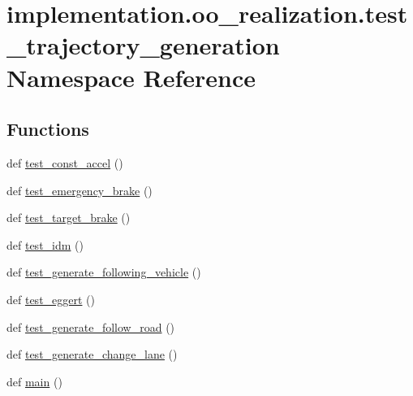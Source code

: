 \hypertarget{namespaceimplementation_1_1oo__realization_1_1test__trajectory__generation}{}\section{implementation.\+oo\+\_\+realization.\+test\+\_\+trajectory\+\_\+generation Namespace Reference}
\label{namespaceimplementation_1_1oo__realization_1_1test__trajectory__generation}
\subsection*{Functions}
\begin{DoxyCompactItemize}
\item 
def \hyperlink{namespaceimplementation_1_1oo__realization_1_1test__trajectory__generation_aebf0c701a8b55043999a700b885de569}{test\+\_\+const\+\_\+accel} ()
\item 
def \hyperlink{namespaceimplementation_1_1oo__realization_1_1test__trajectory__generation_ae0fc4f9b9bbc4b4bce8898095266b1f8}{test\+\_\+emergency\+\_\+brake} ()
\item 
def \hyperlink{namespaceimplementation_1_1oo__realization_1_1test__trajectory__generation_a980cd1b5ab3b0805b0dcfa8ecf2ce305}{test\+\_\+target\+\_\+brake} ()
\item 
def \hyperlink{namespaceimplementation_1_1oo__realization_1_1test__trajectory__generation_aaf46799e33cfac12586b07dd5e6a46ae}{test\+\_\+idm} ()
\item 
def \hyperlink{namespaceimplementation_1_1oo__realization_1_1test__trajectory__generation_a24e03d73fc5b3c1550dd9d5d553253b2}{test\+\_\+generate\+\_\+following\+\_\+vehicle} ()
\item 
def \hyperlink{namespaceimplementation_1_1oo__realization_1_1test__trajectory__generation_ac2de94b74c182efcd5aebd435137fbf2}{test\+\_\+eggert} ()
\item 
def \hyperlink{namespaceimplementation_1_1oo__realization_1_1test__trajectory__generation_a8ff53a547e1e07c1dd237b13b7bf13fd}{test\+\_\+generate\+\_\+follow\+\_\+road} ()
\item 
def \hyperlink{namespaceimplementation_1_1oo__realization_1_1test__trajectory__generation_a5656fb7325f040e832e5883920ebf38c}{test\+\_\+generate\+\_\+change\+\_\+lane} ()
\item 
def \hyperlink{namespaceimplementation_1_1oo__realization_1_1test__trajectory__generation_a3dc833e2f1f95efe4769e28eaaef082d}{main} ()
\end{DoxyCompactItemize}


